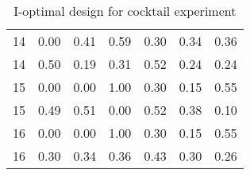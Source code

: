 \begin{table}[ht]
\begin{tabular}{lrrrrrr}
  14 & 0.00 & 0.41 & 0.59 & 0.30 & 0.34 & 0.36 \\ 
  14 & 0.50 & 0.19 & 0.31 & 0.52 & 0.24 & 0.24 \\ 
  15 & 0.00 & 0.00 & 1.00 & 0.30 & 0.15 & 0.55 \\ 
  15 & 0.49 & 0.51 & 0.00 & 0.52 & 0.38 & 0.10 \\ 
  16 & 0.00 & 0.00 & 1.00 & 0.30 & 0.15 & 0.55 \\ 
  16 & 0.30 & 0.34 & 0.36 & 0.43 & 0.30 & 0.26 \\ 
   \hline
\end{tabular}
\caption{I-optimal design for cocktail experiment} 
\label{tab:cocktail_exp_i_optimal_des}
\end{table}
